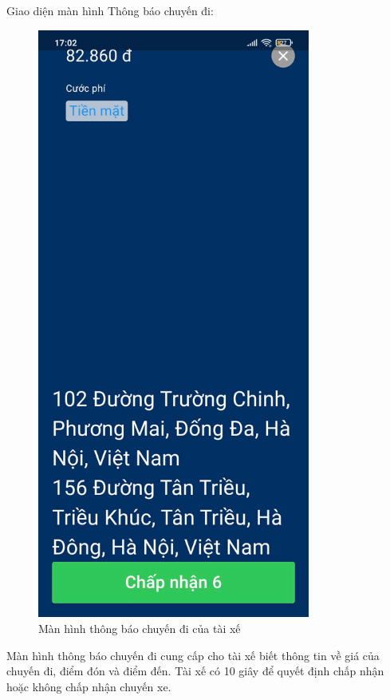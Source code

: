 \documentclass[../DoAn.tex]{subfiles}
\begin{document}
Giao diện màn hình Thông báo chuyến đi:
\begin{figure}[H]
    \centering
    \includegraphics[width=0.8\textwidth]{Hinhve/Anh_man_hinh_thong_bao_chuyen_di.png}
    \caption{Màn hình thông báo chuyến đi của tài xế}
    \label{fig:Anh_man_hinh_thong_bao_chuyen_di}
\end{figure}
Màn hình thông báo chuyến đi cung cấp cho tài xế biết thông tin về giá của chuyến đi,
điểm đón và điểm đến.
Tài xế có 10 giây để quyết định chấp nhận hoặc không chấp nhận chuyến xe.
\end{document}
